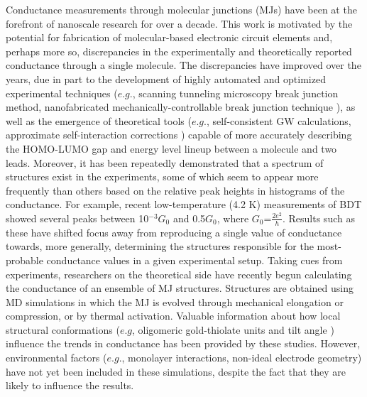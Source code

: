 \documentclass[10pt]{report}  %
\newcommand\findent{\hspace*{\parindent}}
\begin{document}
\findent Conductance measurements through molecular junctions (MJs) have been at the forefront of nanoscale research for over a decade. \cite{Tao:2006,Nitzan:2003,Nichols:2010} This work is motivated by the potential for fabrication of molecular-based electronic circuit elements \cite{Bandyopadhyay:2010} and, perhaps more so, discrepancies in the experimentally \cite{Reed:1997} and theoretically \cite{DiVentra:2000} reported conductance through a single molecule. The discrepancies have improved over the years,\cite{Lindsay:2007} due in part to the development of highly automated and optimized experimental techniques ($e.g.$, scanning tunneling microscopy break junction method, \cite{Xu:2003,Venkataraman:2006,Venkataraman-nature:2006} nanofabricated mechanically-controllable break junction technique \cite{Tsutsui:2006,Tsutsui:2009}), as well as the emergence of theoretical tools ($e.g.$, self-consistent GW calculations,\cite{Strange:2011} approximate self-interaction corrections \cite{Toher:2007,Pontes:2011}) capable of more accurately describing the HOMO-LUMO gap and energy level lineup between a molecule and two leads.  Moreover, it has been repeatedly demonstrated that a spectrum of structures exist in the experiments, some of which seem to appear more frequently than others based on the relative peak heights in histograms of the conductance. \cite{Xu:2003,Venkataraman:2006,Venkataraman-nature:2006,Tsutsui:2006,Tsutsui:2009,Xiao:2004,Huang:2007,Li:2008,Haiss:2006,Haiss:2008,Haiss:2009,Mishchenko:2010,Kim:2011} For example, recent low-temperature (4.2 K) measurements of BDT showed several peaks between 10$^{-3}$$G_{0}$ and 0.5$G_{0}$, where $G_{0}$=$\frac{2e^{2}}{h}$.\cite{Kim:2011}  Results such as these have shifted focus away from reproducing a single value of conductance towards, more generally, determining the structures responsible for the most-probable conductance values in a given experimental setup.\cite{Haiss:2009}  Taking cues from experiments, researchers on the theoretical side have recently begun calculating the conductance of an ensemble of MJ structures. \cite{Paulsson:2009,Strange:2010,Sergueev:2010,Pontes:2011,Andrews:2008,Cao:2008,Maul:2009,Kim:2010}  Structures are obtained using MD simulations in which the MJ is evolved through mechanical elongation \cite{Paulsson:2009,Strange:2010,Sergueev:2010,Pontes:2011} or compression, \cite{Sergueev:2010} or by thermal activation. \cite{Andrews:2008,Cao:2008,Maul:2009,Kim:2010}  Valuable information about how local structural conformations ($e.g$, oligomeric gold-thiolate units \cite{Strange:2010} and tilt angle \cite{Sergueev:2010}) influence the trends in conductance has been provided by these studies.  However, environmental factors ($e.g.$, monolayer interactions, non-ideal electrode geometry) have not yet been included in these simulations, despite the fact that they are likely to influence the results.\cite{Haiss:2009,Fatemi:2011}
\end{document}
